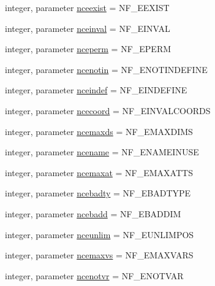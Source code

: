 \begin{DoxyCompactItemize}
\item 
integer, parameter \hyperlink{namespacenetcdf__nf__data_af4635532b17b950069faaae33b196fba}{nceexist} = N\+F\+\_\+\+E\+E\+X\+I\+ST
\item 
integer, parameter \hyperlink{namespacenetcdf__nf__data_a3a5571519fa1d0f18858874ecb7f7b33}{nceinval} = N\+F\+\_\+\+E\+I\+N\+V\+AL
\item 
integer, parameter \hyperlink{namespacenetcdf__nf__data_a2b1b6addf2f81da54af71f390068562a}{nceperm} = N\+F\+\_\+\+E\+P\+E\+RM
\item 
integer, parameter \hyperlink{namespacenetcdf__nf__data_a3f59b9d6d8fc5b25dfc8852d0fb82f72}{ncenotin} = N\+F\+\_\+\+E\+N\+O\+T\+I\+N\+D\+E\+F\+I\+NE
\item 
integer, parameter \hyperlink{namespacenetcdf__nf__data_a053b754902b374e4b3f4b03f38c19c8c}{nceindef} = N\+F\+\_\+\+E\+I\+N\+D\+E\+F\+I\+NE
\item 
integer, parameter \hyperlink{namespacenetcdf__nf__data_a4401a712be65d397ee27b7348a3e4ad8}{ncecoord} = N\+F\+\_\+\+E\+I\+N\+V\+A\+L\+C\+O\+O\+R\+DS
\item 
integer, parameter \hyperlink{namespacenetcdf__nf__data_a30bb2c6df61929c01a88049b1a88e01c}{ncemaxds} = N\+F\+\_\+\+E\+M\+A\+X\+D\+I\+MS
\item 
integer, parameter \hyperlink{namespacenetcdf__nf__data_ad87db061a8ccce892328e35e2e0b1ec1}{ncename} = N\+F\+\_\+\+E\+N\+A\+M\+E\+I\+N\+U\+SE
\item 
integer, parameter \hyperlink{namespacenetcdf__nf__data_a672787d382099c1a16156ef5df15d517}{ncemaxat} = N\+F\+\_\+\+E\+M\+A\+X\+A\+T\+TS
\item 
integer, parameter \hyperlink{namespacenetcdf__nf__data_a8d54e06d25b56b67e22147d96ed2ac66}{ncebadty} = N\+F\+\_\+\+E\+B\+A\+D\+T\+Y\+PE
\item 
integer, parameter \hyperlink{namespacenetcdf__nf__data_a0ccc9e2af8331c8d0c84d297a83a549e}{ncebadd} = N\+F\+\_\+\+E\+B\+A\+D\+D\+IM
\item 
integer, parameter \hyperlink{namespacenetcdf__nf__data_a9840acd59eabccbd513b901cc09b4503}{nceunlim} = N\+F\+\_\+\+E\+U\+N\+L\+I\+M\+P\+OS
\item 
integer, parameter \hyperlink{namespacenetcdf__nf__data_ae7841d937011b029b4abd6162d4d2965}{ncemaxvs} = N\+F\+\_\+\+E\+M\+A\+X\+V\+A\+RS
\item 
integer, parameter \hyperlink{namespacenetcdf__nf__data_a95cc359e752fa7c1a3d304f5106e8b68}{ncenotvr} = N\+F\+\_\+\+E\+N\+O\+T\+V\+AR
\item 

\end{DoxyCompactItemize}
